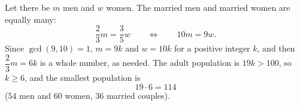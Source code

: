 Let there be $m$ men and $w$ women. The married men and married women are equally many:
\[
\dfrac{2}{3}m=\dfrac{3}{5}w\qquad\Longleftrightarrow\qquad 10m=9w .
\]
Since $\gcd(9,10)=1$, $m=9k$ and $w=10k$ for a positive integer $k$, and then $\dfrac{2}{3}m=6k$ is a whole number, as needed. The adult population is $19k>100$, so $k\ge6$, and the smallest population is
\[
19\cdot6=\boxed{114}
\]
($54$ men and $60$ women, $36$ married couples).
